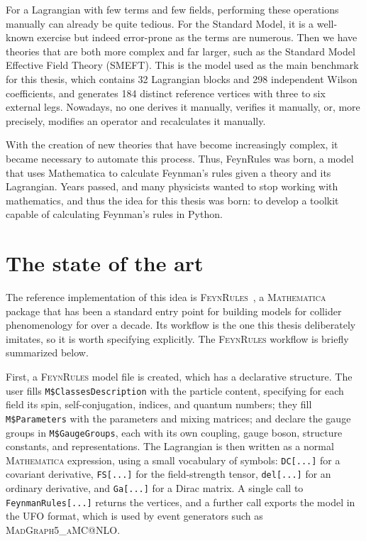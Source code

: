 For a Lagrangian with few terms and few fields, performing these operations manually can already be quite tedious. For the Standard Model, it is a well-known exercise but indeed error-prone as the terms are numerous. Then we have theories that are both more complex and far larger, such as the Standard Model Effective Field Theory (SMEFT). This is the model used as the main benchmark for this thesis, which contains 32 Lagrangian blocks and 298 independent Wilson coefficients, and generates 184 distinct reference vertices with three to six external legs. Nowadays, no one derives it manually, verifies it manually, or, more precisely, modifies an operator and recalculates it manually.

With the creation of new theories that have become increasingly complex, it became necessary to automate this process. Thus, FeynRules was born, a model that uses Mathematica to calculate Feynman's rules given a theory and its Lagrangian. Years passed, and many physicists wanted to stop working with mathematics, and thus the idea for this thesis was born: to develop a toolkit capable of calculating Feynman's rules in Python.

\section{The state of the art}
\label{sec:intro-state-of-the-art}



The reference implementation of this idea is
\textsc{FeynRules}~\cite{Christensen:2008py,Alloul:2013bka}, a
\textsc{Mathematica} package that has been a standard entry point for building models
for collider phenomenology for over a decade. Its workflow is the one
this thesis deliberately imitates, so it is worth specifying explicitly. The \textsc{FeynRules} workflow is briefly summarized below.

First, a \textsc{FeynRules} model file is created, which has a declarative structure. The user fills
\texttt{M\$ClassesDescription} with the particle content, specifying for each field
its spin, self-conjugation, indices, and quantum numbers; they fill
\texttt{M\$Parameters} with the parameters and mixing matrices; and declare
the gauge groups in \texttt{M\$GaugeGroups}, each with its own coupling,
gauge boson, structure constants, and representations. The Lagrangian
is then written as a normal \textsc{Mathematica} expression, using a small
vocabulary of symbols: \texttt{DC[...]} for a covariant derivative,
\texttt{FS[...]} for the field-strength tensor, \texttt{del[...]} for an ordinary derivative, and \texttt{Ga[...]} for a Dirac matrix. A single call to
\texttt{FeynmanRules[...]} returns the vertices, and a further call exports
the model in the UFO format, which is used by event generators such as \textsc{MadGraph5\_aMC@NLO}.

